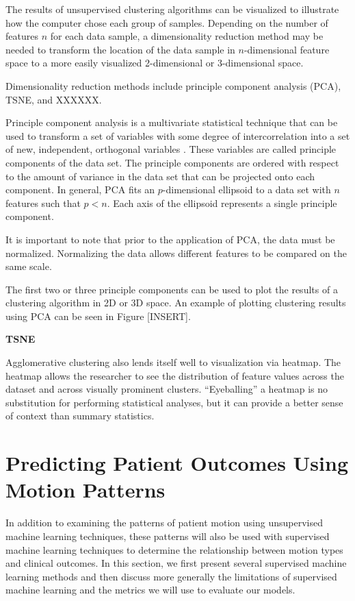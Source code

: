 The results of unsupervised clustering algorithms can be visualized to illustrate how the computer chose each group of samples. Depending on the number of features $n$ for each data sample, a dimensionality reduction method may be needed to transform the location of the data sample in $n$-dimensional feature space to a more easily visualized 2-dimensional or 3-dimensional space.

Dimensionality reduction methods include principle component analysis (PCA), TSNE, and XXXXXX.

Principle component analysis is a multivariate statistical technique that can be used to transform a set of variables with some degree of intercorrelation into a set of new, independent, orthogonal variables \cite{Abdi2010}. These variables are called principle components of the data set. The principle components are ordered with respect to the amount of variance in the data set that can be projected onto each component. In general, PCA fits an $p$-dimensional ellipsoid to a data set with $n$ features such that $p < n$. Each axis of the ellipsoid represents a single principle component. 

It is important to note that prior to the application of PCA, the data must be normalized. Normalizing the data allows different features to be compared on the same scale.

The first two or three principle components can be used to plot the results of a clustering algorithm in 2D or 3D space. An example of plotting clustering results using PCA can be seen in Figure [INSERT].

\textbf{TSNE}

Agglomerative clustering also lends itself well to visualization via heatmap. The heatmap allows the researcher to see the distribution of feature values across the dataset and across visually prominent clusters. ``Eyeballing'' a heatmap is no substitution for performing statistical analyses, but it can provide a better sense of context than summary statistics.  

\section{Predicting Patient Outcomes Using Motion Patterns}

In addition to examining the patterns of patient motion using unsupervised machine learning techniques, these patterns will also be used with supervised machine learning techniques to determine the relationship between motion types and clinical outcomes. In this section, we first present several supervised machine learning methods and then discuss more generally the limitations of supervised machine learning and the metrics we will use to evaluate our models.

